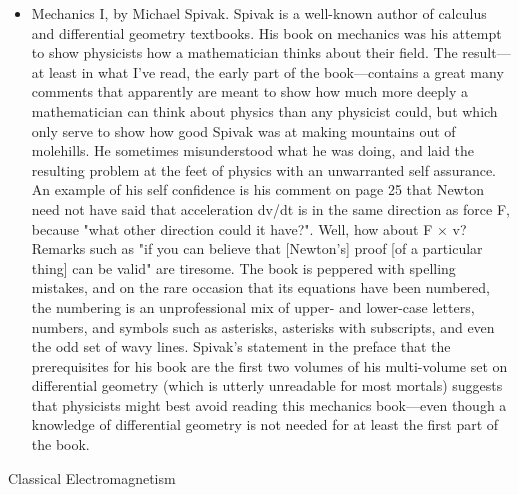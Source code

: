 \documentclass[10pt,a4paper]{book}
\theoremstyle{definition}
\begin{document}
\begin{itemize}
\item Mechanics I, by Michael Spivak.
Spivak is a well-known author of calculus and differential geometry textbooks.  His book on mechanics was his attempt to show physicists how a mathematician thinks about their field.  The result—at least in what I've read, the early part of the book—contains a great many comments that apparently are meant to show how much more deeply a mathematician can think about physics than any physicist could, but which only serve to show how good Spivak was at making mountains out of molehills.  He sometimes misunderstood what he was doing, and laid the resulting problem at the feet of physics with an unwarranted self assurance.  An example of his self confidence is his comment on page 25 that Newton need not have said that acceleration dv/dt is in the same direction as force F, because "what other direction could it have?".  Well, how about F × v?  Remarks such as "if you can believe that [Newton's] proof [of a particular thing] can be valid" are tiresome.  The book is peppered with spelling mistakes, and on the rare occasion that its equations have been numbered, the numbering is an unprofessional mix of upper- and lower-case letters, numbers, and symbols such as asterisks, asterisks with subscripts, and even the odd set of wavy lines.  Spivak's statement in the preface that the prerequisites for his book are the first two volumes of his multi-volume set on differential geometry (which is utterly unreadable for most mortals) suggests that physicists might best avoid reading this mechanics book—even though a knowledge of differential geometry is not needed for at least the first part of the book.
\end{itemize}


Classical Electromagnetism
\end{document}

